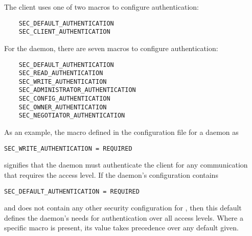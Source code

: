The client uses one of two macros to configure authentication:
\begin{verbatim}
    SEC_DEFAULT_AUTHENTICATION
    SEC_CLIENT_AUTHENTICATION
\end{verbatim}

For the daemon, there are seven macros to configure authentication:
\begin{verbatim}
    SEC_DEFAULT_AUTHENTICATION
    SEC_READ_AUTHENTICATION
    SEC_WRITE_AUTHENTICATION
    SEC_ADMINISTRATOR_AUTHENTICATION
    SEC_CONFIG_AUTHENTICATION
    SEC_OWNER_AUTHENTICATION
    SEC_NEGOTIATOR_AUTHENTICATION
\end{verbatim}

As an example, the macro defined in the configuration file
for a daemon as
\begin{verbatim}
SEC_WRITE_AUTHENTICATION = REQUIRED
\end{verbatim}
signifies that the daemon must authenticate the client for
any communication that requires the  access level.
If the daemon's configuration contains
\begin{verbatim}
SEC_DEFAULT_AUTHENTICATION = REQUIRED
\end{verbatim}
and does not contain any other security configuration for
\verb@AUTHENTICATION@, then this default defines the daemon's needs
for authentication over all access levels.
Where a specific macro is present, its value takes
precedence over any default given.


